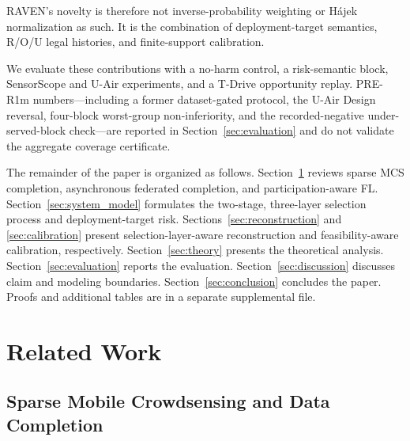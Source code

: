 \documentclass[letterpaper,journal]{IEEEtran}
\begin{document}
RAVEN's novelty is therefore not inverse-probability weighting or H\'ajek
normalization as such.  It is the combination of deployment-target semantics,
R/O/U legal histories, and finite-support calibration.

We evaluate these contributions with a no-harm control, a risk-semantic
block, SensorScope and U-Air experiments, and a T-Drive
opportunity replay.  PRE-R1m numbers---including a former dataset-gated
protocol, the U-Air Design reversal, four-block worst-group
non-inferiority, and the recorded-negative under-served-block
check---are reported in Section~\ref{sec:evaluation} and do not validate
the aggregate coverage certificate.

The remainder of the paper is organized as follows.
Section~\ref{sec:related_work} reviews sparse MCS completion, asynchronous
federated completion, and participation-aware FL.
Section~\ref{sec:system_model} formulates the two-stage, three-layer selection
process and deployment-target risk.
Sections~\ref{sec:reconstruction} and \ref{sec:calibration} present
selection-layer-aware reconstruction and feasibility-aware calibration,
respectively.
Section~\ref{sec:theory} presents the theoretical analysis.
Section~\ref{sec:evaluation} reports the evaluation.
Section~\ref{sec:discussion} discusses claim and modeling boundaries.
Section~\ref{sec:conclusion} concludes the paper.
Proofs and additional tables are in a separate supplemental file.


\section{Related Work}
\label{sec:related_work}

\subsection{Sparse Mobile Crowdsensing and Data Completion}
\end{document}
